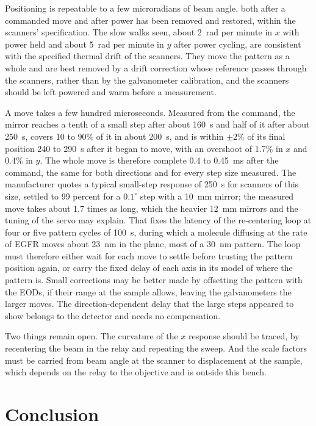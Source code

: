 \documentclass{article}
\begin{document}
Positioning is repeatable to a few microradians of beam angle, both after a commanded move and after
power has been removed and restored, within the scanners' specification. The slow walks seen, about
2~\textmu rad per minute in $x$ with power held and about 5~\textmu rad per minute in $y$ after power
cycling, are consistent with the specified thermal drift of the scanners. They move the pattern as a
whole and are best removed by a drift correction whose reference passes through the scanners,
rather than by the galvanometer calibration, and the scanners should be left powered and warm before a measurement.

A move takes a few hundred microseconds. Measured from the command, the mirror reaches a tenth of a
small step after about 160~\textmu s and half of it after about 250~\textmu s, covers 10 to 90\% of
it in about 200~\textmu s, and is within $\pm2\%$ of its final position 240 to 290~\textmu s after
it began to move, with an overshoot of 1.7\% in $x$ and 0.4\% in $y$. The whole move is therefore
complete 0.4 to 0.45~ms after the command, the same for both directions and for every step size
measured. The manufacturer quotes a typical small-step response of 250~\textmu s for scanners of
this size, settled to 99 percent for a $0.1^\circ$ step with a 10~mm mirror; the measured move
takes about 1.7 times as long, which the heavier 12~mm mirrors and the tuning of the servo may
explain. That fixes the latency of the re-centering loop at four or five pattern cycles of
100~\textmu s, during which a molecule diffusing at the rate of EGFR moves about 23~nm in the plane,
most of a 30~nm pattern. The loop must therefore either wait for each move to settle before
trusting the pattern position again, or carry the fixed delay of each axis in its model of where
the pattern is. Small corrections may be better made by offsetting the pattern with the
EODs, if their range at the sample allows, leaving the galvanometers the larger moves. The direction-dependent delay that
the large steps appeared to show belongs to the detector and needs no compensation.

Two things remain open. The curvature of the $x$ response should be traced, by recentering the beam
in the relay and repeating the sweep. And the scale factors must be carried from beam angle at the
scanner to displacement at the sample, which depends on the relay to the objective and is outside
this bench.
\FloatBarrier

\section{Conclusion}
\label{sec:conclusion}
\end{document}
